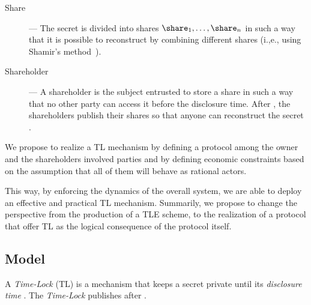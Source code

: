 \begin{description}

	\smallskip
    \item [Share] --- The secret \secret is divided into \N shares ${\share}_1,\dots,{\share}_n$ in such a way that it is possible to reconstruct \secret by combining \K different shares (i.,e., using Shamir's method~\cite{Shamir:1979:SS:359168.359176}).

	\smallskip
    \item [Shareholder] --- A shareholder \shareholder is the subject entrusted to store a share in such a way that no other party can access it before the disclosure time. After \td, the shareholders publish their shares so that anyone can reconstruct the secret \secret.

\end{description}

We propose to realize a TL mechanism by defining a protocol among the owner and the shareholders involved parties and by defining economic constraints based on the assumption that all of them will behave as rational actors.

This way, by enforcing the dynamics of the overall system, we are able to deploy an effective and practical TL mechanism.
Summarily, we propose to change the perspective from the production of a TLE scheme,  to the realization of a protocol that offer TL as the logical consequence of the protocol itself.



\subsection{Model}

\newcommand{\users}{{\ensuremath{\mathcal{U}}}\xspace}
\newcommand{\wallet}[1]{\mathit{wlt}(#1)}

%
A \textit{Time-Lock} (TL) is a mechanism that keeps a secret \secret private until its {\em disclosure time} \td. 
%
The \textit{Time-Lock} publishes \secret{}  after \td.


